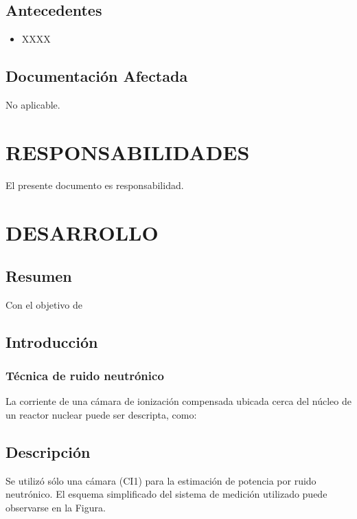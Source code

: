 \documentclass[a4paper,11pt]{article}
\begin{document}
\subsection{Antecedentes}

\begin{itemize}
  \item XXXX
\end{itemize}




\subsection{Documentación Afectada}
No aplicable.

\setlength{\parskip}{0.3cm plus1mm minus1mm}


\section{RESPONSABILIDADES}

El presente documento es responsabilidad.
 
\section{DESARROLLO}

\subsection*{Resumen}

Con el objetivo de 

\subsection{Introducción}


\subsubsection{Técnica de ruido neutrónico}

La corriente de una cámara de ionización compensada ubicada cerca del núcleo de un reactor nuclear puede ser descripta,  como:


\subsection{Descripción}
Se utilizó sólo una cámara (CI1) para la estimación de potencia por ruido neutrónico.
El esquema simplificado del sistema de medición utilizado puede observarse en la Figura.
\end{document}

